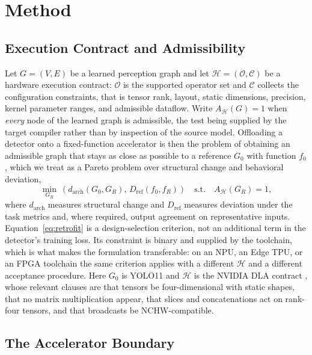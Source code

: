 \section{Method}
\label{sec:method}



\subsection{Execution Contract and Admissibility}
\label{sec:contract}

Let $G=(V,E)$ be a learned perception graph and let
$\mathcal{H}=(\mathcal{O},\mathcal{C})$ be a hardware execution contract:
$\mathcal{O}$ is the supported operator set and $\mathcal{C}$ collects the
configuration constraints, that is tensor rank, layout, static dimensions,
precision, kernel parameter ranges, and admissible dataflow. Write
$A_{\mathcal{H}}(G)=1$ when \emph{every} node of the learned graph is
admissible, the test being supplied by the target compiler rather than by
inspection of the source model. Offloading a detector onto a fixed-function
accelerator is then the problem of obtaining an admissible graph that stays as
close as possible to a reference $G_0$ with function $f_0$, which we treat as a
Pareto problem over structural change and behavioral deviation,
\begin{equation}
\min_{G_R}\ \left(d_{\mathrm{arch}}(G_0,G_R),\,
D_{\mathrm{ref}}(f_0,f_R)\right)
\quad\text{s.t.}\quad A_{\mathcal{H}}(G_R)=1,
\label{eq:retrofit}
\end{equation}
where $d_{\mathrm{arch}}$ measures structural change and $D_{\mathrm{ref}}$
measures deviation under the task metrics and, where required, output agreement
on representative inputs. Equation~\eqref{eq:retrofit} is a design-selection
criterion, not an additional term in the detector's training loss. Its
constraint is binary and supplied by the toolchain, which is what makes the
formulation transferable: on an NPU, an Edge TPU, or an FPGA toolchain the same
criterion applies with a different $\mathcal{H}$ and a different acceptance
procedure. Here $G_0$ is YOLO11 \cite{jocher2024yolo11} and $\mathcal{H}$ is the
NVIDIA DLA contract \cite{nvidia_dla_restrictions,nvidia_dla_build}, whose
relevant clauses are that tensors be four-dimensional with static shapes, that
no matrix multiplication appear, that slices and concatenations act on rank-four
tensors, and that broadcasts be NCHW-compatible.

\subsection{The Accelerator Boundary}
\label{sec:boundary}

